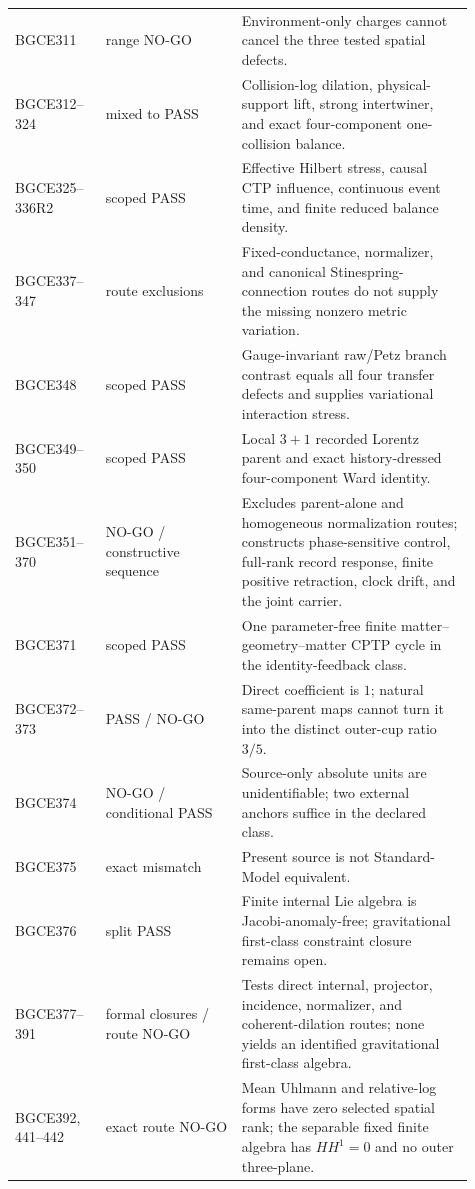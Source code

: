 \documentclass[11pt]{article}
\theoremstyle{definition}
\theoremstyle{remark}
\begin{document}
\begin{longtable}{>{\raggedright\arraybackslash}p{0.18\linewidth} >{\raggedright\arraybackslash}p{0.27\linewidth} >{\raggedright\arraybackslash}p{0.46\linewidth}}
BGCE311 & range NO-GO & Environment-only charges cannot cancel the three tested spatial defects. \\
BGCE312--324 & mixed to PASS & Collision-log dilation, physical-support lift, strong intertwiner, and exact four-component one-collision balance. \\
BGCE325--336R2 & scoped PASS & Effective Hilbert stress, causal CTP influence, continuous event time, and finite reduced balance density. \\
BGCE337--347 & route exclusions & Fixed-conductance, normalizer, and canonical Stinespring-connection routes do not supply the missing nonzero metric variation. \\
BGCE348 & scoped PASS & Gauge-invariant raw/Petz branch contrast equals all four transfer defects and supplies variational interaction stress. \\
BGCE349--350 & scoped PASS & Local $3+1$ recorded Lorentz parent and exact history-dressed four-component Ward identity. \\
BGCE351--370 & NO-GO / constructive sequence & Excludes parent-alone and homogeneous normalization routes; constructs phase-sensitive control, full-rank record response, finite positive retraction, clock drift, and the joint carrier. \\
BGCE371 & scoped PASS & One parameter-free finite matter--geometry--matter CPTP cycle in the identity-feedback class. \\
BGCE372--373 & PASS / NO-GO & Direct coefficient is $1$; natural same-parent maps cannot turn it into the distinct outer-cup ratio $3/5$. \\
BGCE374 & NO-GO / conditional PASS & Source-only absolute units are unidentifiable; two external anchors suffice in the declared class. \\
BGCE375 & exact mismatch & Present source is not Standard-Model equivalent. \\
BGCE376 & split PASS & Finite internal Lie algebra is Jacobi-anomaly-free; gravitational first-class constraint closure remains open. \\
BGCE377--391 & formal closures / route NO-GO & Tests direct internal, projector, incidence, normalizer, and coherent-dilation routes; none yields an identified gravitational first-class algebra. \\
BGCE392, 441--442 & exact route NO-GO & Mean Uhlmann and relative-log forms have zero selected spatial rank; the separable fixed finite algebra has $HH^1=0$ and no outer three-plane. \\

\end{longtable}
\end{document}
